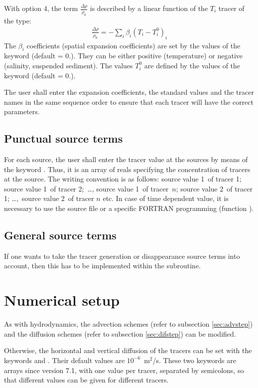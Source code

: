 With option 4, the term $\frac{\Delta \rho }{\rho _{0} } $ is described by a
linear function of the $T_i$ tracer of the type:
\begin{align}
\frac{\Delta \rho }{\rho _{0} } =-\sum _{i}\beta _{i}  (T_{i} -T_{i}^{0} )_{i}
\end{align}
The $\beta_{i}$ coefficients (spatial expansion coefficients) are set by the
values of the keyword  (default
= 0.). They can be either positive (temperature) or negative (salinity,
suspended sediment). The values $T_{i}^{0}$ are defined by the values of the
keyword  (default = 0.).

The user shall enter the expansion coefficients, the standard values and the
tracer names in the same sequence order to ensure that each tracer will have
the correct parameters.

\subsection{Punctual source terms}

For each source, the user shall enter the tracer value at the sources by means
of the keyword . Thus, it is an
array of reals specifying the concentration of tracers at the source. The
writing convention is as follows: source value 1~of tracer 1; source value 1~of
tracer 2;~\dots , source value 1~of tracer~$n$; source value 2~of tracer
1; \dots ,~source value 2~of tracer $n$ etc. In case of time dependent
value, it is necessary to use the source file or a specific FORTRAN programming
(function ).


\subsection{General source terms}

If one wants to take the tracer generation or disappearance source terms into
account, then this has to be implemented within the 
subroutine.

\section{Numerical setup}

As with hydrodynamics, the advection schemes  (refer to subsection \ref{sec:advstep}) and the diffusion schemes
 (refer to subsection
\ref{sec:difstep}) can be modified.

Otherwise, the horizontal and vertical diffusion of the tracers can be set with
the keywords  and
. Their default values
are $10^{-6}$~m${}^{2}$/s.
These two keywords are arrays since version 7.1, with one value per tracer,
separated by semicolons, so that different values can be given for different
tracers.

